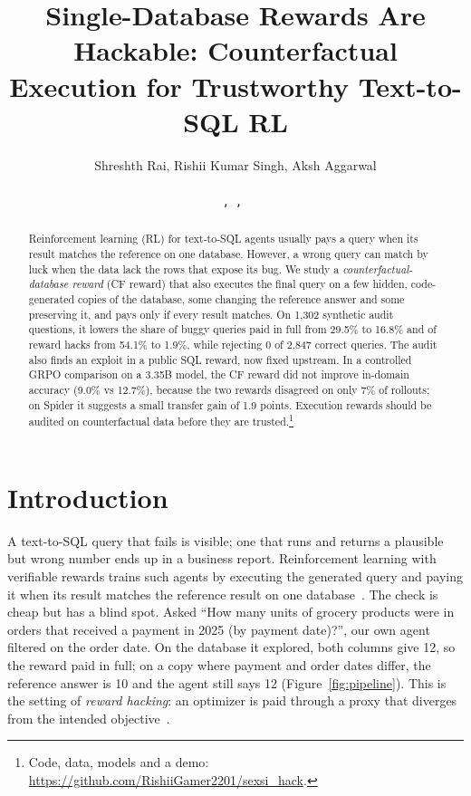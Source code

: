 \documentclass{article}
\title{Single-Database Rewards Are Hackable: Counterfactual Execution for Trustworthy Text-to-SQL RL}
\author{%
  Shreshth Rai, \quad Rishii Kumar Singh, \quad Aksh Aggarwal \\
  \placeholder{Affiliation(s) TBD} \\
  \texttt{\placeholder{email TBD}, \placeholder{email TBD}, \placeholder{email TBD}}
}
\begin{document}
\maketitle

\begin{abstract}
Reinforcement learning (RL) for text-to-SQL agents usually pays a query when its result matches the reference on one database. However, a wrong query can match by luck when the data lack the rows that expose its bug. We study a \emph{counterfactual-database reward} (CF reward) that also executes the final query on a few hidden, code-generated copies of the database, some changing the reference answer and some preserving it, and pays only if every result matches. On 1,302 synthetic audit questions, it lowers the share of buggy queries paid in full from 29.5\% to 16.8\% and of reward hacks from 54.1\% to 1.9\%, while rejecting 0 of 2,847 correct queries. The audit also finds an exploit in a public SQL reward, now fixed upstream. In a controlled GRPO comparison on a 3.35B model, the CF reward did not improve in-domain accuracy (9.0\% vs 12.7\%), because the two rewards disagreed on only 7\% of rollouts; on Spider it suggests a small transfer gain of 1.9 points. Execution rewards should be audited on counterfactual data before they are trusted.\footnote{Code, data, models and a demo: \url{https://github.com/RishiiGamer2201/sexsi_hack}.}
\end{abstract}

\section{Introduction}
\label{sec:intro}

A text-to-SQL query that fails is visible; one that runs and returns a plausible but wrong number ends up in a business report. Reinforcement learning with verifiable rewards trains such agents by executing the generated query and paying it when its result matches the reference result on one database~\citep{ma2025sqlr1,pourreza2025,yao2025arctic}. The check is cheap but has a blind spot. Asked ``How many units of grocery products were in orders that received a payment in 2025 (by payment date)?'', our own agent filtered on the order date. On the database it explored, both columns give 12, so the reward paid in full; on a copy where payment and order dates differ, the reference answer is 10 and the agent still says 12 (Figure~\ref{fig:pipeline}). This is the setting of \emph{reward hacking}: an optimizer is paid through a proxy that diverges from the intended objective~\citep{amodei2016,skalse2022,gao2023}.
\end{document}
